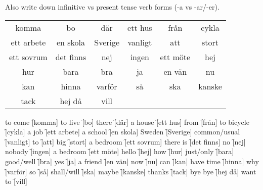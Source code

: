 \begin{flushleft}
    Also write down infinitive vs present tense verb forms (-a vs -ar/-er).
\end{flushleft}
\begin{center}
    \begin{tabular}{|c c c c c c|}
        \hline
        komma & bo & där & ett hus & från & cykla \\
        ett arbete & en skola & Sverige & vanligt & att & stort \\
        ett sovrum & det finns & nej & ingen & ett möte & hej \\
        hur & bara & bra & ja & en vän & nu \\
        kan & hinna & varför & så & ska & kanske \\
        tack & hej då & vill &&& \\
        \hline
    \end{tabular}
\end{center}

\begin{questions}
    \begin{multicols}{2}
        \raggedcolumns
        \question to come \f[komma]
        \question to live \f[bo]
        \question there \f[där]
        \question a house \f[ett hus]
        \question from \f[från]
        \question to bicycle \f[cykla]
        \question a job \f[ett arbete]
        \question a school \f[en skola]
        \question Sweden \f[Sverige]
        \question common/usual \f[vanligt]
        \question to \f[att]
        \question big \f[stort]
        \question a bedroom \f[ett sovrum]
        \question there is \f[det finns]
        \question no \f[nej]
        \question nobody \f[ingen]
        \question a bedroom \f[ett möte]
        \question hello \f[hej]
        \question how \f[hur]
        \question just/only \f[bara]
        \question good/well \f[bra]
        \question yes \f[ja]
        \question a friend \f[en vän]
        \question now \f[nu]
        \question can \f[kan]
        \question have time \f[hinna]
        \question why \f[varför]
        \question so \f[så]
        \question shall/will \f[ska]
        \question maybe \f[kanske]
        \question thanks \f[tack]
        \question bye bye \f[hej då]
        \question want to \f[vill]
    \end{multicols}
\end{questions}
